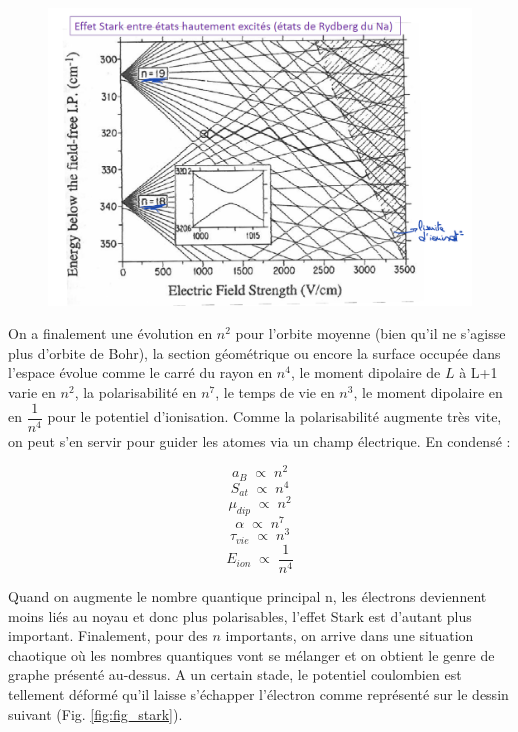 \begin{figure}[htp]
    \centering
    \includegraphics[scale=0.7]{Images2/GrapheStark.PNG}
\end{figure}

On a finalement une évolution en $n^2$ pour l'orbite moyenne (bien qu'il ne s'agisse plus d'orbite de Bohr), la section géométrique ou encore la surface occupée dans l'espace évolue comme le carré du rayon en $n^4$, le moment dipolaire de $L$ à L+1 varie en $n^2$, la polarisabilité en $n^7$, le temps de vie en $n^3$, le moment dipolaire en en $\dfrac{1}{n^4}$ pour le potentiel d'ionisation. Comme la polarisabilité augmente très vite, on peut s'en servir pour guider les atomes via un champ électrique. En condensé :

\[
    a_B \; \propto\; n^2
\]
\[
    S_{at} \; \propto\; n^4
\]
\[
    \mu_{dip} \; \propto\; n^2
\]
\[
    \alpha \; \propto\; n^7
\]
\[
    \tau_{vie} \; \propto\; n^3
\]
\[
    E_{ion} \; \propto\; \dfrac{1}{n^4}
\]

Quand on augmente le nombre quantique principal n, les électrons deviennent moins liés au noyau et donc plus polarisables, l'effet Stark est d'autant plus important. Finalement, pour des $n$ importants, on arrive dans une situation chaotique où les nombres quantiques vont se mélanger et on obtient le genre de graphe présenté au-dessus. A un certain stade, le potentiel coulombien est tellement déformé qu'il laisse s'échapper l'électron comme représenté sur le dessin suivant (Fig. \ref{fig:fig_stark}).\\

